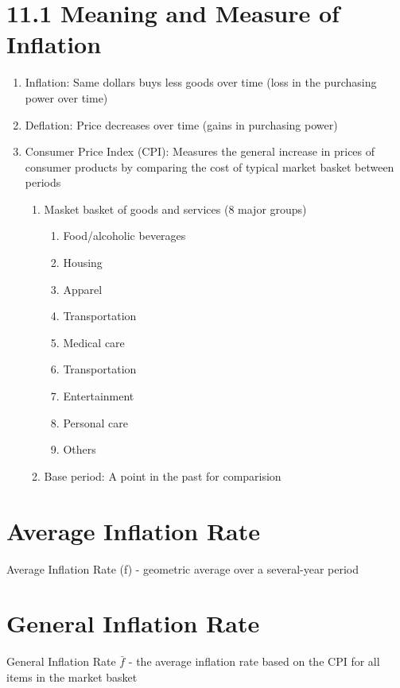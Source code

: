 \documentclass{report} %
\begin{document}
\section*{11.1 Meaning and Measure of Inflation}
\begin{enumerate}
    \item Inflation: Same dollars buys less goods over time (loss in the purchasing power over time)
    \item Deflation: Price decreases over time (gains in purchasing power)
    \item Consumer Price Index (CPI): Measures the general increase in prices of consumer products by comparing the cost of typical market basket between periods
    \begin{enumerate}
        \item Masket basket of goods and services (8 major groups)
        \begin{enumerate}
            \item Food/alcoholic beverages
            \item Housing 
            \item Apparel
            \item Transportation
            \item Medical care
            \item Transportation
            \item Entertainment
            \item Personal care
            \item Others
        \end{enumerate}
        \item Base period: A point in the past for comparision
    \end{enumerate}
\end{enumerate}

\section*{Average Inflation Rate}
Average Inflation Rate (f) - geometric average over a several-year period

\section*{General Inflation Rate}
General Inflation Rate $\bar{f}$ - the average inflation rate based on the CPI for all items in the market basket
\end{document}
